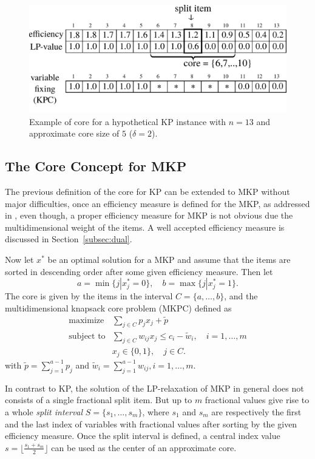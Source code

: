 \begin{figure}[h]
  \centering
  \includegraphics[scale=0.406]{imgs/kp_3}
  \caption{Example of core for a hypothetical KP instance with $n=13$ and approximate core size of $5$ ($\delta = 2$).}
  \label{fig:kpcore}
\end{figure}

\subsection{The Core Concept for MKP}

The previous definition of the core for KP can be extended to MKP without major
difficulties, once an efficiency measure is defined for the MKP,
as addressed in \cite{puchinger2006core}, even though,
a proper efficiency measure for MKP is not obvious due the
multidimensional weight of the items.
A well accepted efficiency measure is discussed in Section~\ref{subsec:dual}.

Now let $x^*$ be an optimal solution for a MKP and assume that the items are
sorted in descending order after some given efficiency measure. Then let
\begin{displaymath}
  a = \min \{ j | x_j^* = 0 \}, \quad b = \max \{ j | x_j^* = 1 \}.
\end{displaymath}
The core is given by the items in the interval $C = \{ a, \ldots, b \}$,
and the multidimensional knapsack core problem (MKPC) defined as
\begin{align*}
  \text{maximize} & \sum_{j \in C} p_j x_j  + \tilde{p}\\
  \text{subject to} & \sum_{j \in C} w_{ij} x_j \leqslant c_i - \tilde{w}_i, \quad i = 1, \ldots, m\\
  & x_j \in \{0, 1\}, \quad j \in C.
\end{align*}
with $\tilde{p} = \sum^{a-1}_{j=1} p_j$  and $\tilde{w}_i = \sum^{a-1}_{j=1} w_{ij}, i = 1, \ldots, m$.

In contrast to KP, the solution of the LP-relaxation of MKP in general does not
consists of a single fractional split item. But up to $m$ fractional values give
rise to a whole \emph{split interval} $S = \{ s_1, \ldots, s_m\}$, where
$s_1$ and $s_m$ are respectively the first and the last index of variables with
fractional values after sorting by the given efficiency measure.
Once the split interval is defined, a central index value $s = \lfloor \frac{s_1+s_m}{2}\rfloor$
can be used as the center of an approximate core.

